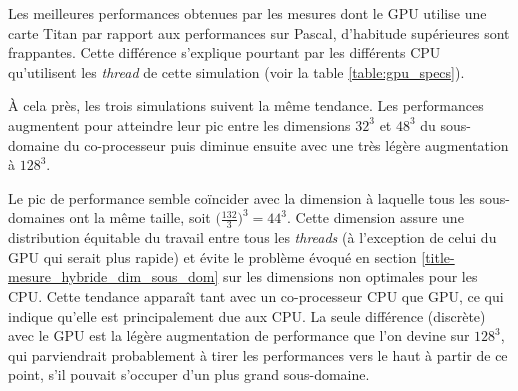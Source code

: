 Les meilleures performances obtenues par les mesures dont le \acs{GPU} utilise une carte Titan par rapport aux performances sur Pascal, d'habitude supérieures sont frappantes. Cette différence s'explique pourtant par les différents \acs{CPU} qu'utilisent les \textit{thread} de cette simulation (voir la table \ref{table:gpu_specs}).

À cela près, les trois simulations suivent la même tendance. Les performances augmentent pour atteindre leur pic entre les dimensions $32^3$ et $48^3$ du sous-domaine du co-processeur puis diminue ensuite avec une très légère augmentation à $128^3$.

Le pic de performance semble coïncider avec la dimension à laquelle tous les sous-domaines ont la même taille, soit $\big(\frac{132}{3}\big)^3 = 44^3$. Cette dimension assure une distribution équitable du travail entre tous les \textit{threads} (à l'exception de celui du \acs{GPU} qui serait plus rapide) et évite le problème évoqué en section \ref{title-mesure_hybride_dim_sous_dom} sur  les dimensions non optimales pour les \acs{CPU}. Cette tendance apparaît tant avec un co-processeur \acs{CPU} que \acs{GPU}, ce qui indique qu'elle est principalement due aux \acs{CPU}. La seule différence (discrète) avec le \acs{GPU} est la légère augmentation de performance que l'on devine sur $128^3$, qui parviendrait probablement à tirer les performances vers le haut à partir de ce point, s'il pouvait s'occuper d'un plus grand sous-domaine.
  
